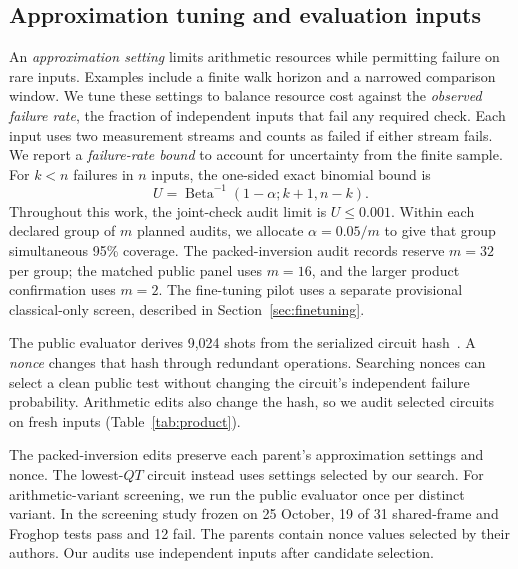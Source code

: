 \documentclass[aps,prx,reprint,raggedbottom,superscriptaddress,longbibliography,floatfix]{revtex4-2}
\begin{document}
\subsection{Approximation tuning and evaluation inputs}
\label{sec:approximation}
An \emph{approximation setting} limits arithmetic resources while permitting failure on rare inputs.
Examples include a finite walk horizon and a narrowed comparison window.
We tune these settings to balance resource cost against the \emph{observed failure rate}, the fraction of independent inputs that fail any required check.
Each input uses two measurement streams and counts as failed if either stream fails.
We report a \emph{failure-rate bound} to account for uncertainty from the finite sample.
For $k<n$ failures in $n$ inputs, the one-sided exact binomial bound is
\begin{equation}
U=\operatorname{Beta}^{-1}(1-\alpha;k+1,n-k).
\end{equation}
Throughout this work, the joint-check audit limit is $U\le0.001$.
Within each declared group of $m$ planned audits, we allocate $\alpha=0.05/m$ to give that group simultaneous 95\% coverage.
The packed-inversion audit records reserve $m=32$ per group; the matched public panel uses $m=16$, and the larger product confirmation uses $m=2$.
The fine-tuning pilot uses a separate provisional classical-only screen, described in Section~\ref{sec:finetuning}.

The public evaluator derives 9,024 shots from the serialized circuit hash~\cite{openauto}.
A \emph{nonce} changes that hash through redundant operations.
Searching nonces can select a clean public test without changing the circuit's independent failure probability.
Arithmetic edits also change the hash, so we audit selected circuits on fresh inputs (Table~\ref{tab:product}).

The packed-inversion edits preserve each parent's approximation settings and nonce.
The lowest-$QT$ circuit instead uses settings selected by our search.
For arithmetic-variant screening, we run the public evaluator once per distinct variant.
In the screening study frozen on 25 October, 19 of 31 shared-frame and Froghop tests pass and 12 fail.
The parents contain nonce values selected by their authors.
Our audits use independent inputs after candidate selection.
\end{document}
